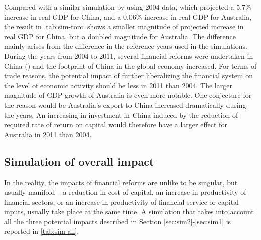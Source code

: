 \documentclass[AER]{AEA}
\begin{document}
Compared with a similar simulation by \cite{gretton2015} using 2004 data, 
which projected a 5.7\% increase in real GDP for China, and a 0.06\% 
increase in real GDP for Australia, 
the result in \autoref{tab:sim-rorc} shows a smaller magnitude of projected increase 
in real GDP for China, but a doubled magnitude for Australia. 
The difference mainly arises from the difference in the reference years used in the 
simulations. 
During the years from 2004 to 2011, several financial reforms were undertaken in 
China () and the footprint of China in the global economy increased.
For terms of trade reasons, the potential impact of further liberalizing 
the financial system on the level of economic activity should be less
in 2011 than 2004.   
The larger magnitude of GDP growth of Australia is even more notable. 
One conjecture for the reason would be Australia's export to China 
increased dramatically during the years. 
An increasing in investment in China induced by the reduction of required 
rate of return on capital would therefore have a larger effect for Australia 
in 2011 than 2004. 

\subsection{Simulation of overall impact}
\label{sec:sim4}

In the reality, the impacts of financial reforms are unlike to be 
singular, but usually manifold -- a reduction in cost of capital,
an increase in productivity of financial sectors, or an increase 
in productivity of financial service or capital inputs, 
usually take place at the same time. 
A simulation that takes into account all the three 
potential impacts described in Section \ref{sec:sim2}-\ref{sec:sim1} 
is reported in \autoref{tab:sim-all}.
\end{document}
